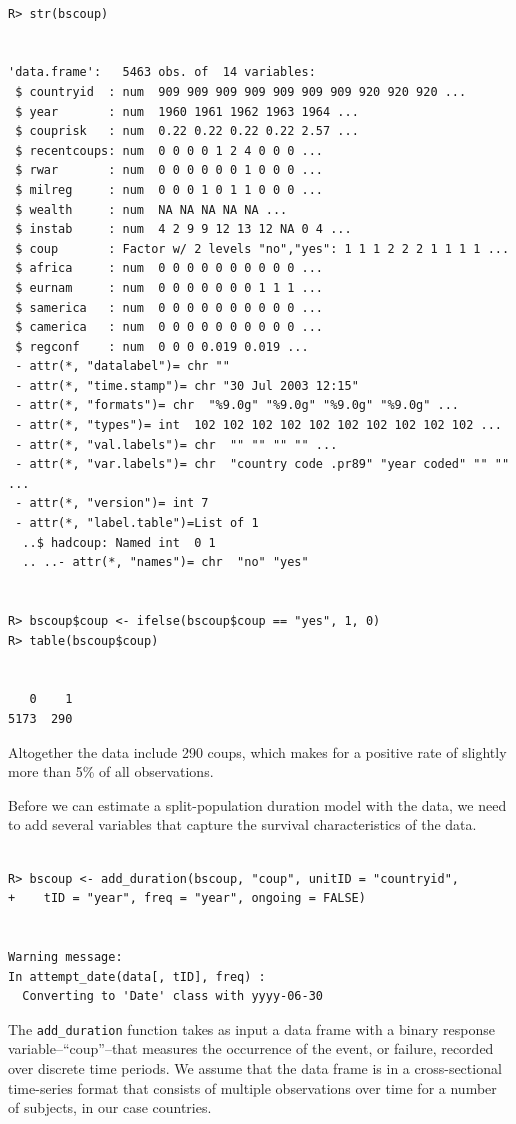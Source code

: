 \documentclass[12pt,onesided]{amsart}
\begin{document}
\begin{lstlisting}

R> str(bscoup)


'data.frame':	5463 obs. of  14 variables:
 $ countryid  : num  909 909 909 909 909 909 909 920 920 920 ...
 $ year       : num  1960 1961 1962 1963 1964 ...
 $ couprisk   : num  0.22 0.22 0.22 0.22 2.57 ...
 $ recentcoups: num  0 0 0 0 1 2 4 0 0 0 ...
 $ rwar       : num  0 0 0 0 0 0 1 0 0 0 ...
 $ milreg     : num  0 0 0 1 0 1 1 0 0 0 ...
 $ wealth     : num  NA NA NA NA NA ...
 $ instab     : num  4 2 9 9 12 13 12 NA 0 4 ...
 $ coup       : Factor w/ 2 levels "no","yes": 1 1 1 2 2 2 1 1 1 1 ...
 $ africa     : num  0 0 0 0 0 0 0 0 0 0 ...
 $ eurnam     : num  0 0 0 0 0 0 0 1 1 1 ...
 $ samerica   : num  0 0 0 0 0 0 0 0 0 0 ...
 $ camerica   : num  0 0 0 0 0 0 0 0 0 0 ...
 $ regconf    : num  0 0 0 0.019 0.019 ...
 - attr(*, "datalabel")= chr ""
 - attr(*, "time.stamp")= chr "30 Jul 2003 12:15"
 - attr(*, "formats")= chr  "%9.0g" "%9.0g" "%9.0g" "%9.0g" ...
 - attr(*, "types")= int  102 102 102 102 102 102 102 102 102 102 ...
 - attr(*, "val.labels")= chr  "" "" "" "" ...
 - attr(*, "var.labels")= chr  "country code .pr89" "year coded" "" "" ...
 - attr(*, "version")= int 7
 - attr(*, "label.table")=List of 1
  ..$ hadcoup: Named int  0 1
  .. ..- attr(*, "names")= chr  "no" "yes"


R> bscoup$coup <- ifelse(bscoup$coup == "yes", 1, 0)
R> table(bscoup$coup)


   0    1
5173  290 

\end{lstlisting}

Altogether the data include 290 coups, which makes for a positive rate of slightly more than 5\% of all observations. 

Before we can estimate a split-population duration model with the data, we need to add several variables that capture the survival characteristics of the data.

\begin{lstlisting}

R> bscoup <- add_duration(bscoup, "coup", unitID = "countryid", 
+    tID = "year", freq = "year", ongoing = FALSE)


Warning message:
In attempt_date(data[, tID], freq) :
  Converting to 'Date' class with yyyy-06-30

\end{lstlisting}

The \texttt{add\_duration} function takes as input a data frame with a
binary response variable--``coup''--that measures the occurrence of the
event, or failure, recorded over discrete time periods. We assume that
the data frame is in a cross-sectional time-series format that consists
of multiple observations over time for a number of subjects, in our case
countries.
\end{document}
